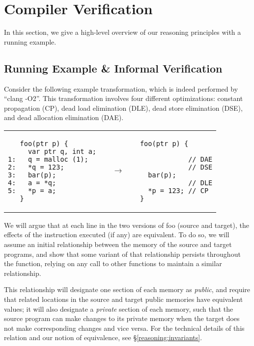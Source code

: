 \section{Compiler Verification}
\label{sec:intptrcast:compiler-verification}

In this section, we give a high-level overview of our reasoning principles
with a running example.

\subsection{Running Example \& Informal Verification}
\label{reasoning:running}

Consider the following example transformation, which is indeed
performed by ``clang -O2''.  This transformation involves four different optimizations: constant propagation (CP), dead load elimination
(DLE), dead store elimination (DSE), and dead allocation elimination
(DAE).
\begin{center}
\begin{tabular}{@{}l@{}l@{}l@{}}
\begin{lstlisting}
   foo(ptr p) {
     var ptr q, int a;
1:   q = malloc (1);
2:   *q = 123;
3:   bar(p);
4:   a = *q;
5:   *p = a;
   }
\end{lstlisting}
&
$\quad\rightarrow\quad$
&
\begin{lstlisting}
foo(ptr p) {

            // DAE
            // DSE
  bar(p);
            // DLE
  *p = 123; // CP
}
\end{lstlisting}
\end{tabular}
\end{center}

We will argue that at each line in the two versions of foo (source and target), the effects of the instruction executed (if any) are equivalent. To do so, we will assume an initial relationship between the memory of the source and target programs, and show that some variant of that relationship persists throughout the function, relying on any call to other functions to maintain a similar relationship. 

This relationship will designate one section of each memory as \emph{public}, and require that related locations in the source and target public memories have equivalent values; it will also designate a \emph{private} section of each memory, such that the source program can make changes to its private memory when the target does not make corresponding changes and vice versa. For the technical details of this relation and our notion of equivalence, see \S\ref{reasoning:invariants}.

